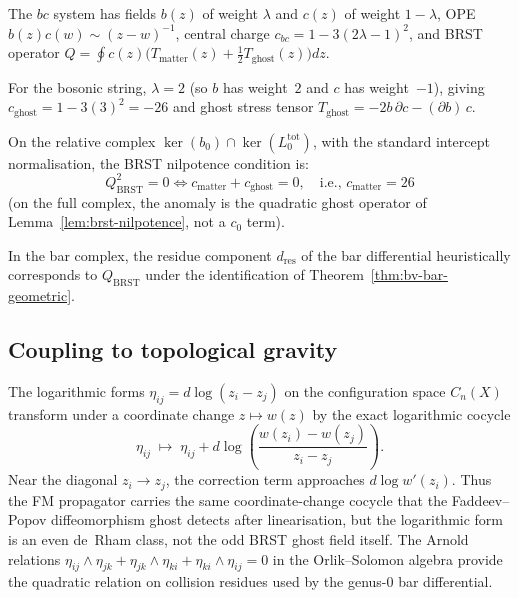 \begin{example}
The $bc$ system has fields $b(z)$ of weight $\lambda$ and $c(z)$ of weight $1-\lambda$, OPE $b(z)c(w) \sim (z-w)^{-1}$, central charge $c_{bc} = 1 - 3(2\lambda - 1)^2$, and BRST operator $Q = \oint c(z) \bigl(T_{\text{matter}}(z) + \tfrac{1}{2}T_{\text{ghost}}(z)\bigr) dz$.

For the bosonic string, $\lambda = 2$ (so $b$ has weight~$2$ and $c$ has weight~$-1$), giving $c_{\text{ghost}} = 1 - 3(3)^2 = -26$ and ghost stress tensor $T_{\text{ghost}} = -2b\,\partial c - (\partial b)\,c$.

On the relative complex $\ker(b_0) \cap \ker(L_0^{\mathrm{tot}})$,
with the standard intercept normalisation, the BRST nilpotence
condition is:
\[
Q_{\mathrm{BRST}}^2 = 0
\iff c_{\mathrm{matter}} + c_{\mathrm{ghost}} = 0,
\quad\text{i.e., } c_{\mathrm{matter}} = 26
\]
(on the full complex, the anomaly is the quadratic ghost operator
of Lemma~\ref{lem:brst-nilpotence}, not a $c_0$ term).

In the bar complex, the residue component $d_{\mathrm{res}}$
of the bar differential heuristically corresponds to $Q_{\mathrm{BRST}}$
under the identification of Theorem~\ref{thm:bv-bar-geometric}.
\end{example}

\subsection{Coupling to topological gravity}

\begin{theorem}
\label{thm:log-form-ghost-law}
The logarithmic forms $\eta_{ij} = d\log(z_i - z_j)$
on the configuration space $C_n(X)$ transform under a coordinate
change $z\mapsto w(z)$ by the exact logarithmic cocycle
\[
\eta_{ij} \;\mapsto\; \eta_{ij}
+ d\log\!\left(\frac{w(z_i) - w(z_j)}{z_i - z_j}\right).
\]
Near the diagonal $z_i \to z_j$, the correction term
approaches $d\log w'(z_i)$. Thus the FM propagator carries the
same coordinate-change cocycle that the Faddeev--Popov
diffeomorphism ghost detects after linearisation, but the
logarithmic form is an even de~Rham class, not the odd BRST ghost
field itself. The Arnold relations
$\eta_{ij} \wedge \eta_{jk} + \eta_{jk} \wedge \eta_{ki}
+ \eta_{ki} \wedge \eta_{ij} = 0$
in the Orlik--Solomon algebra provide the quadratic relation on
collision residues used by the genus-$0$ bar differential.
\end{theorem}

